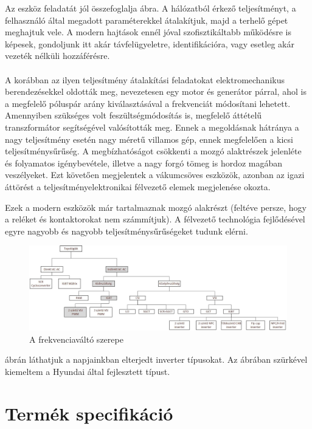 Az eszköz feladatát jól összefoglalja  ábra. A hálózatból érkező teljesítményt, a felhasználó által megadott paraméterekkel átalakítjuk, majd a terhelő gépet meghajtuk vele. A modern hajtások ennél jóval szofisztikáltabb működésre is képesek, gondoljunk itt akár távfelügyeletre, identifikációra, vagy esetleg akár vezeték nélküli hozzáférésre.

\paragraph{}
A korábban az ilyen teljesítmény átalakítási feladatokat elektromechanikus berendezésekkel oldották meg, nevezetesen egy motor és generátor párral, ahol is a megfelelő póluspár arány kiválasztásával a frekvenciát módosítani lehetett. Amennyiben szükséges volt feszültségmódosítás is, megfelelő áttételű transzformátor segítségével valósították meg. Ennek a megoldásnak hátránya a nagy teljesítmény esetén nagy méretű villamos gép, ennek megfelelően a kicsi teljesítménysűrűség. A megbízhatóságot csökkenti a mozgó alaktrészek jelenléte és folyamatos igénybevétele, illetve a nagy forgó tömeg is hordoz magában veszélyeket. Ezt követően megjelentek a vákumcsöves eszközök, azonban az igazi áttörést a teljesítményelektronikai félvezető elemek megjelenése okozta.

Ezek a modern eszközök már tartalmaznak mozgó alakrészt (feltéve persze, hogy a reléket és kontaktorokat nem számmítjuk). A félvezető technológia fejlődésével egyre nagyobb és nagyobb teljesítménysűrűségeket tudunk elérni.

\begin{figure}[!h]
	\centering
	\includegraphics[width = \textwidth]{figures/topologies.jpg}
	\caption{A frekvenciaváltó szerepe} 
	\label{fig:topologies}
\end{figure}

 ábrán láthatjuk a napjainkban elterjedt inverter típusokat. Az ábrában szürkével kiemeltem a Hyundai által fejlesztett típust.

\section{Termék specifikáció}

